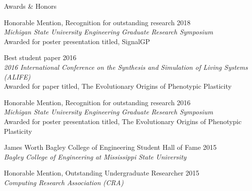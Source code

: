 \begin{rSection}{Awards \& Honors}

Honorable Mention, Recognition for outstanding research \hfill 2018 \\
\tab \textit{Michigan State University Engineering Graduate Research Symposium} \\
\tab Awarded for poster presentation titled, SignalGP

Best student paper \hfill 2016 \\
\tab \textit{2016 International Conference on the Synthesis and Simulation of Living Systems (ALIFE)} \\
\tab Awarded for paper titled, The Evolutionary Origins of Phenotypic Plasticity

Honorable Mention, Recognition for outstanding research \hfill 2016 \\
\tab \textit{Michigan State University Engineering Graduate Research Symposium} \\
\tab Awarded for poster presentation titled, The Evolutionary Origins of Phenotypic Plasticity

James Worth Bagley College of Engineering Student Hall of Fame \hfill 2015 \\
\tab \textit{Bagley College of Engineering at Mississippi State University}

Honorable Mention, Outstanding Undergraduate Researcher  \hfill 2015 \\
\tab \textit{Computing Research Association (CRA)}

\end{rSection}